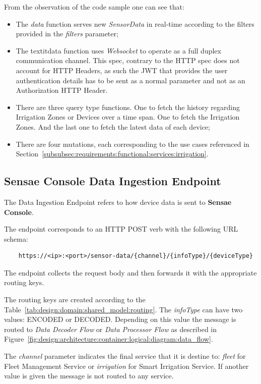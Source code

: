 From the observation of the code sample one can see that:

\begin{itemize}
    \item The \textit{data} function serves new \textit{SensorData} in real-time according to the filters provided in the \textit{filters} parameter;
    \item The textit{data} function uses \textit{Websocket} to operate as a full duplex communication channel. This spec, contrary to the HTTP spec does not account for HTTP Headers, as such the \gls{JWT} that provides the user authentication details has to be sent as a normal parameter and not as an Authorization HTTP Header.
    \item  There are three query type functions. One to fetch the history regarding Irrigation Zones or Devices over a time span. One to fetch the Irrigation Zones. And the last one to fetch the latest data of each device;
    \item There are four mutations, each corresponding to the use cases referenced in Section~\ref{subsubsec:requirements:functional:services:irrigation}.
\end{itemize}

\subsection{Sensae Console Data Ingestion Endpoint}
\label{subsec:implementation:description:ingestion}

The Data Ingestion Endpoint refers to how device data is sent to \textbf{Sensae Console}.

The endpoint corresponds to an HTTP POST verb with the following \gls{URL} schema:

\begin{verbatim}
    https://<ip>:<port>/sensor-data/{channel}/{infoType}/{deviceType}
\end{verbatim}

The endpoint collects the request body and then forwards it with the appropriate routing keys.

The routing keys are created according to the Table~\ref{tab:design:domain:shared_model:routing}. The \textit{infoType} can have two values: ENCODED or DECODED. Depending on this value the message is routed to \textit{Data Decoder Flow} or \textit{Data Processor Flow} as described in Figure~\ref{fig:design:architecture:container:logical:diagram:data_flow}.

The \textit{channel} parameter indicates the final service that it is destine to: \textit{fleet} for Fleet Management Service or \textit{irrigation} for Smart Irrigation Service. If another value is given the message is not routed to any service.

